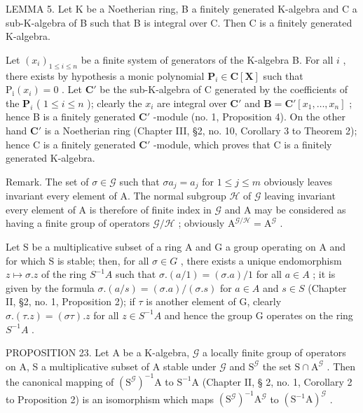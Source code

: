LEMMA 5. Let K be a Noetherian ring, B a finitely generated K-algebra and C a sub-K-algebra of B such that B is integral over C. Then C is a finitely generated K-algebra.

Let \((x_{i})_{1\leqslant i\leqslant n}\) be a finite system of generators of the K-algebra B. For all \(i\) , there exists by hypothesis a monic polynomial \(\mathbf{P}_i\in \mathbf{C}[\mathbf{X}]\) such that \(\mathrm{P_i}(x_i) = 0\) . Let \(\mathbf{C}'\) be the sub-K-algebra of C generated by the coefficients of the \(\mathbf{P}_i\) ( \(1\leqslant i\leqslant n\) ); clearly the \(x_{i}\) are integral over \(\mathbf{C}'\) and \(\mathbf{B} = \mathbf{C}'[x_1,\dots,x_n]\) ; hence B is a finitely generated \(\mathbf{C}'\) -module (no. 1, Proposition 4). On the other hand \(\mathbf{C}'\) is a Noetherian ring (Chapter III, §2, no. 10, Corollary 3 to Theorem 2); hence C is a finitely generated \(\mathbf{C}'\) -module, which proves that C is a finitely generated K-algebra.

Remark. The set of \(\sigma \in \mathcal{G}\) such that \(\sigma a_{j} = a_{j}\) for \(1 \leqslant j \leqslant m\) obviously leaves invariant every element of A. The normal subgroup \(\mathcal{H}\) of \(\mathcal{G}\) leaving invariant every element of A is therefore of finite index in \(\mathcal{G}\) and A may be considered as having a finite group of operators \(\mathcal{G}/\mathcal{H}\) ; obviously \(\mathrm{A}^{\mathcal{G}/\mathcal{H}} = \mathrm{A}^{\mathcal{G}}\) .

Let S be a multiplicative subset of a ring A and G a group operating on A and for which S is stable; then, for all \(\sigma\in G\) , there exists a unique endomorphism \(z\mapsto\sigma.z\) of the ring \(S^{-1}A\) such that \(\sigma.(a/1)=(\sigma.a)/1\) for all \(a\in A\) ; it is given by the formula \(\sigma.(a/s)=(\sigma.a)/( \sigma.s)\) for \(a\in A\) and \(s\in S\) (Chapter II, §2, no. 1, Proposition 2); if \(\tau\) is another element of G, clearly \(\sigma.(\tau.z)=(\sigma\tau).z\) for all \(z\in S^{-1}A\) and hence the group G operates on the ring \(S^{-1}A\) .

PROPOSITION 23. Let A be a K-algebra, \(\mathcal{G}\) a locally finite group of operators on A, S a multiplicative subset of A stable under \(\mathcal{G}\) and \(\mathrm{S}^{\mathcal{G}}\) the set \(\mathrm{S} \cap \mathrm{A}^{\mathcal{G}}\) . Then the canonical mapping of \((\mathrm{S}^{\mathcal{G}})^{-1}\mathrm{A}\) to \(\mathrm{S}^{-1}\mathrm{A}\) (Chapter II, § 2, no. 1, Corollary 2 to Proposition 2) is an isomorphism which maps \((\mathrm{S}^{\mathcal{G}})^{-1}\mathrm{A}^{\mathcal{G}}\) to \((\mathrm{S}^{-1}\mathrm{A})^{\mathcal{G}}\) .

